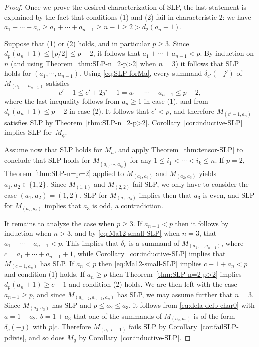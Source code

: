 \documentclass[11pt,reqno]{amsart}
\newcommand{\ul}[1]{\underline{#1}}
\theoremstyle{definition}
\theoremstyle{remark}
\numberwithin{equation}{section}
\begin{document}
\begin{proof}
    Once we prove the desired characterization of SLP, the last statement is explained by the fact that conditions (1) and (2) fail in characteristic $2$: we have $a_1+\cdots+a_n\geq a_1+\cdots+a_{n-1}\geq n-1\geq 2>d_2(a_n+1)$.

    Suppose that (1) or (2) holds, and in particular $p\geq 3$. Since $d_p(a_{n}+1)\leq \lfloor p/2\rfloor\leq p-2$, it follows that $a_1+\cdots+a_{n-1}<p$. By induction on $n$ (and using Theorem~\ref{thm:SLP-n=2-p>2} when $n=3$) it follows that SLP holds for $(a_1,\cdots,a_{n-1})$. Using \eqref{eq:SLP-forMa}, every summand $\delta_{c'}(-j')$ of $M_{(a_1,\cdots,a_{n-1})}$ satisfies
    \[c'-1\leq c'+2j'-1=a_1+\cdots+a_{n-1}\leq p-2,\]
    where the last inequality follows from $a_n\geq 1$ in case (1), and from $d_p(a_n+1)\leq p-2$ in case (2). It follows that $c'<p$, and therefore $M_{(c'-1,a_n)}$ satisfies SLP by Theorem~\ref{thm:SLP-n=2-p>2}. Corollary~\ref{cor:inductive-SLP} implies SLP for~$M_{\ul{a}}$.

    Assume now that SLP holds for $M_{\ul{a}}$, and apply Theorem~\ref{thm:tensor-SLP} to conclude that SLP holds for $M_{(a_{i_1},\cdots,a_{i_k})}$ for any  $1\leq i_1<\cdots<i_k\leq n$. If $p=2$, Theorem~\ref{thm:SLP-n=p=2} applied to $M_{(a_1,a_3)}$ and $M_{(a_2,a_3)}$ yields $a_1,a_2\in\{1,2\}$. Since $M_{(1,1)}$ and $M_{(2,2)}$ fail SLP, we only have to consider the case $(a_1,a_2)=(1,2)$. SLP for $M_{(a_1,a_3)}$ implies then that $a_3$ is even, and SLP for $M_{(a_2,a_3)}$ implies that $a_3$ is odd, a contradiction. 
    
    It remains to analyze the case when $p\geq 3$. If $a_{n-1}<p$ then it follows by induction when $n>3$, and by \eqref{eq:Ma12-small-SLP} when $n=3$, that $a_1+\cdots+a_{n-1}<p$. This implies that $\delta_c$ is a summand of $M_{(a_1,\cdots,a_{n-1})}$, where $c=a_1+\cdots+a_{n-1}+1$, while Corollary~\ref{cor:inductive-SLP} implies that $M_{(c-1,a_n)}$ has SLP. If $a_n<p$ then \eqref{eq:Ma12-small-SLP} implies $c-1+a_n<p$ and condition (1) holds. If $a_n\geq p$ then Theorem~\ref{thm:SLP-n=2-p>2} implies $d_p(a_n+1)\geq c-1$ and condition (2) holds. We are then left with the case $a_{n-1}\geq p$, and since $M_{(a_{n-2},a_{n-1},a_n)}$ has SLP, we may assume further that $n=3$. Since $M_{(a_2,a_3)}$ has SLP and $p\leq a_2\leq a_3$, it follows from \eqref{eq:dela-delb-char0} with $a=1+a_2$, $b=1+a_3$ that one of the summands of $M_{(a_2,a_3)}$ is of the form $\delta_c(-j)$ with $p|c$. Therefore $M_{(a_1,c-1)}$ fails SLP by Corollary~\ref{cor:failSLP-pdivis}, and so does $M_{\ul{a}}$ by Corollary~\ref{cor:inductive-SLP}.
\end{proof}
\end{document}
